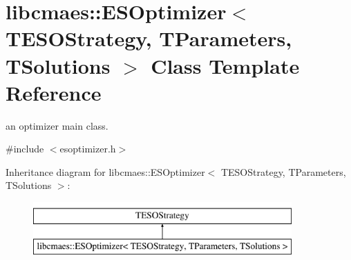 \hypertarget{classlibcmaes_1_1ESOptimizer}{\section{libcmaes\+:\+:E\+S\+Optimizer$<$ T\+E\+S\+O\+Strategy, T\+Parameters, T\+Solutions $>$ Class Template Reference}
\label{classlibcmaes_1_1ESOptimizer}
}


an optimizer main class.  




{\ttfamily \#include $<$esoptimizer.\+h$>$}

Inheritance diagram for libcmaes\+:\+:E\+S\+Optimizer$<$ T\+E\+S\+O\+Strategy, T\+Parameters, T\+Solutions $>$\+:\begin{figure}[H]
\begin{center}
\leavevmode
\includegraphics[height=2.000000cm]{classlibcmaes_1_1ESOptimizer}
\end{center}
\end{figure}
